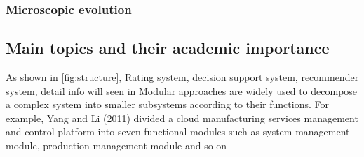 \subsubsection{Microscopic evolution} %
\label{ssub:microscopic_evolution}


\subsection{Main topics and their academic importance}
As shown in \autoref{fig:structure},
Rating system, decision support system, recommender system,
detail info will seen in
Modular approaches are widely used to decompose a complex system into smaller subsystems according to their functions. For example, Yang and Li (2011) divided a cloud manufacturing services management and control platform into seven functional modules such as system management module, production management module and so on

